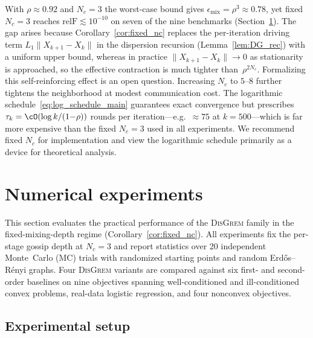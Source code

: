 \documentclass[review,onefignum,onetabnum]{siamart171218}
\begin{document}
\begin{remark}\label{rem:practical_implications}
With $\rho\approx 0.92$ and $N_c=3$ the worst-case bound gives
$\epsilon_{\mathrm{mix}}=\rho^3\approx 0.78$, yet fixed $N_c{=}3$
reaches $\mathrm{relF}\lesssim 10^{-10}$ on seven of the nine benchmarks
(Section~\ref{sec:experiments}).
The gap arises because Corollary~\ref{cor:fixed_nc} replaces the
per-iteration driving term $L_1\|X_{k+1}{-}X_k\|$ in the
dispersion recursion (Lemma~\ref{lem:DG_rec}) with a uniform
upper bound, whereas in practice
$\|X_{k+1}{-}X_k\|\to 0$ as stationarity is approached, so the
effective contraction is much tighter than~$\rho^{2N_c}$.
Formalizing this self-reinforcing effect is an open question.
Increasing $N_c$ to $5$--$8$ further tightens the neighborhood at
modest communication cost.
The logarithmic schedule~\eqref{eq:log_schedule_main} guarantees
exact convergence but prescribes $\tau_k=\cO(\log k/(1{-}\rho))$
rounds per iteration---e.g.\ ${\approx}75$ at $k{=}500$---which is
far more expensive than the fixed $N_c{=}3$ used in all experiments.
We recommend fixed $N_c$ for implementation and view the
logarithmic schedule primarily as a device for theoretical analysis.
\end{remark}




\section{Numerical experiments}\label{sec:experiments}

	This section evaluates the practical performance of the
	\textsc{DisGrem} family in the fixed-mixing-depth regime
	(Corollary~\ref{cor:fixed_nc}).
	All experiments fix the per-stage gossip depth at $N_c=3$ and
	report statistics over 20 independent Monte~Carlo (MC) trials with
	randomized starting points and random Erd\H{o}s--R\'{e}nyi graphs.
	Four \textsc{DisGrem} variants are compared against six first- and
	second-order baselines on nine objectives spanning well-conditioned
	and ill-conditioned convex problems, real-data logistic regression,
	and four nonconvex objectives.
	
	\subsection{Experimental setup}\label{ssec:setup}
	
\end{document}

